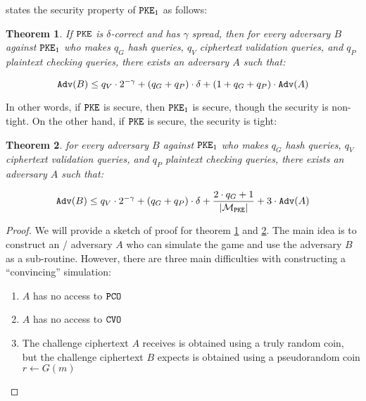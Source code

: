 \documentclass{article}
\newtheorem{theorem}{Theorem}[section]
\begin{document}
\cite{hofheinz2017modular} states the security property of $\texttt{PKE}_1$ as follows:

\begin{theorem}\label{thm:owcpa-implies-owpcva}
    If $\texttt{PKE}$ is $\delta$-correct and has $\gamma$ spread, then for every  adversary $B$ against $\texttt{PKE}_1$ who makes $q_G$ hash queries, $q_V$ ciphertext validation queries, and $q_P$ plaintext checking queries, there exists an  adversary $A$ such that:

    \begin{equation*}
        \texttt{Adv}(B) \leq q_V \cdot 2^{-\gamma}
            + (q_G + q_P) \cdot \delta
            + (1 + q_G + q_P) \cdot \texttt{Adv}(A)
    \end{equation*}
\end{theorem}

In other words, if $\texttt{PKE}$ is  secure, then $\texttt{PKE}_1$ is  secure, though the security is non-tight. On the other hand, if $\texttt{PKE}$ is  secure, the  security is tight:

\begin{theorem}\label{thm:indcpa-implies-owpcva}
    for every  adversary $B$ against $\texttt{PKE}_1$ who makes $q_G$ hash queries, $q_V$ ciphertext validation queries, and $q_P$ plaintext checking queries, there exists an  adversary $A$ such that:

    \begin{equation*}
        \texttt{Adv}(B) \leq q_V \cdot 2^{-\gamma}
            + (q_G + q_P) \cdot \delta
            + \frac{2 \cdot q_G + 1}{\left\lvert {\mathcal{M}_\texttt{PKE}} \right\rvert}
            + 3 \cdot \texttt{Adv}(A)
    \end{equation*}
\end{theorem}

\begin{proof}
    We will provide a sketch of proof for theorem \ref{thm:owcpa-implies-owpcva} and \ref{thm:indcpa-implies-owpcva}. The main idea is to construct an / adversary $A$ who can simulate the  game and use the  adversary $B$ as a sub-routine. However, there are three main difficulties with constructing a ``convincing'' simulation:

    \begin{enumerate}
        \item $A$ has no access to $\texttt{PCO}$
        \item $A$ has no access to $\texttt{CVO}$
        \item The challenge ciphertext $A$ receives is obtained using a truly random coin, but the challenge ciphertext $B$ expects is obtained using a pseudorandom coin $r \leftarrow G(m)$
    \end{enumerate}
\end{proof}



\end{document}
